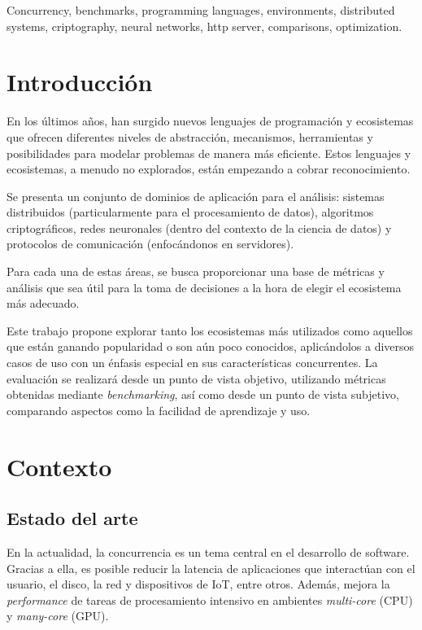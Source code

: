 \documentclass[11pt]{article}
\let\Oldsection\section
\renewcommand{\section}{\FloatBarrier\Oldsection}
\let\Oldsubsection\subsection
\renewcommand{\subsection}{\FloatBarrier\Oldsubsection}
\newcommand{\english}[1]{\textit{#1}}
\begin{document}
Concurrency, benchmarks, programming languages, environments, distributed systems, criptography, neural networks, http server, comparisons, optimization.

\newpage

\section{Introducción}

En los últimos años, han surgido nuevos lenguajes de programación y ecosistemas que ofrecen diferentes niveles de abstracción, mecanismos, herramientas y posibilidades para modelar problemas de manera más eficiente. Estos lenguajes y ecosistemas, a menudo no explorados, están empezando a cobrar reconocimiento.

Se presenta un conjunto de dominios de aplicación para el análisis: sistemas distribuidos (particularmente para el procesamiento de datos), algoritmos criptográficos, redes neuronales (dentro del contexto de la ciencia de datos) y protocolos de comunicación (enfocándonos en servidores).

Para cada una de estas áreas, se busca proporcionar una base de métricas y análisis que sea útil para la toma de decisiones a la hora de elegir el ecosistema más adecuado.

Este trabajo propone explorar tanto los ecosistemas más utilizados como aquellos que están ganando popularidad o son aún poco conocidos, aplicándolos a diversos casos de uso con un énfasis especial en sus características concurrentes. La evaluación se realizará desde un punto de vista objetivo, utilizando métricas obtenidas mediante \english{benchmarking}, así como desde un punto de vista subjetivo, comparando aspectos como la facilidad de aprendizaje y uso.

\newpage

\section{Contexto}

\subsection{Estado del arte}

En la actualidad, la concurrencia es un tema central en el desarrollo de software. Gracias a ella, es posible reducir la latencia de aplicaciones que interactúan con el usuario, el disco, la red y dispositivos de IoT, entre otros. Además, mejora la \english{performance} de tareas de procesamiento intensivo en ambientes \english{multi-core} (CPU) y \english{many-core} (GPU).
\end{document}

